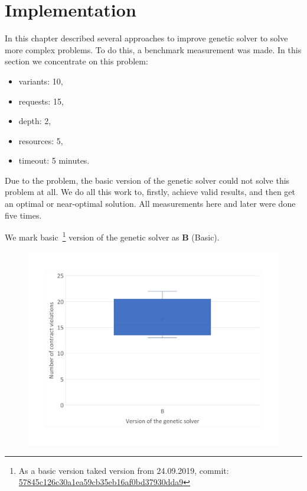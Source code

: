 \chapter{Implementation}\label{chapter:Implementation}

In this chapter described several approaches to improve genetic solver to solve more complex problems.
To do this, a benchmark measurement was made.
In this section we concentrate on this problem:

\begin{itemize}
	\item variants: 10,
	\item requests: 15,
	\item depth: 2,
	\item resources: 5,
	\item timeout: 5 minutes.
\end{itemize}

Due to the problem, the basic version of the genetic solver could not solve this problem at all. We do all this work to, firstly, achieve valid results, and then get an optimal or near-optimal solution. 
All measurements here and later were done five times.


We mark basic~\footnote{As a basic version taked version from 24.09.2019, commit: \href{https://git-st.inf.tu-dresden.de/mquat/mquat2/commit/57845c126c30a1ea59cb35eb16af0bd37930dda9}{57845c126c30a1ea59cb35eb16af0bd37930dda9}} version of the genetic solver as \textbf{B} (Basic).


\begin{figure}[h]
	\centering
	\includegraphics[width=\textwidth]{images/BoxPlotSolverBasic}
	\caption[Boxplot with a number of contract violations for the basic version of genetic solver]{}
	\label{fig:boxplotsolverbasic}
\end{figure}


